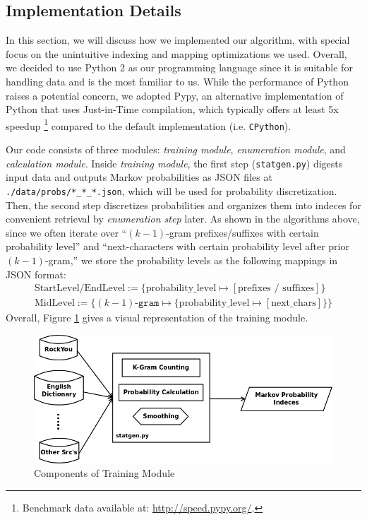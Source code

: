 \documentclass{article} %
\theoremstyle{definition}
\theoremstyle{theorem}
\theoremstyle{remark}
\theoremstyle{remark}
\begin{document}
\subsection{Implementation Details}
\par\quad In this section, we will discuss how we implemented our algorithm, with special focus on the unintuitive indexing and mapping optimizations we used. Overall, we decided to use Python 2 as our programming language since it is suitable for handling data and is the most familiar to us. While the performance of Python raises a potential concern, we adopted Pypy, an alternative implementation of Python that uses Just-in-Time compilation, which typically offers at least 5x speedup \footnote{Benchmark data available at: \url{http://speed.pypy.org/}.} compared to the default implementation (i.e. \texttt{CPython}).

\par\quad Our code consists of three modules: \emph{training module}, \emph{enumeration module}, and \emph{calculation module}. Inside \emph{training module}, the first step (\texttt{statgen.py}) digests input data and outputs Markov probabilities as JSON files at \texttt{./data/probs/*\_*\_*.json}, which will be used for probability discretization. Then, the second step discretizes probabilities and organizes them into indeces for convenient retrieval by \emph{enumeration step} later. As shown in the algorithms above, since we often iterate over ``$(k-1)$-gram prefixes/suffixes with certain probability level'' and ``next-characters with certain probability level after prior $(k-1)$-gram,'' we store the probability levels as the following mappings in JSON format:
\begin{gather*}
\text{StartLevel} / \text{EndLevel} := \{ \text{probability\_level} \mapsto [\text{prefixes / suffixes}] \}                 \\
\text{MidLevel} := \{ \texttt{$(k-1)$-gram} \mapsto \{ \text{probability\_level} \mapsto [\text{next\_chars}]\} \}
\end{gather*}
Overall, Figure \ref{fig:components-training} gives a visual representation of the training module.

    \begin{figure}[!htbp]
        \begin{center}
            \includegraphics[width=.65\textwidth]{diag/components-training.png}
        \end{center}
        \vspace{-15pt}
        \caption{Components of Training Module}
        \label{fig:components-training}
    \end{figure}
\end{document}
